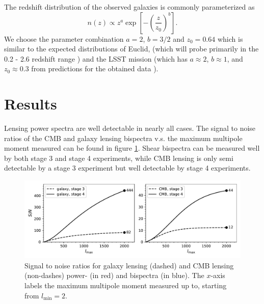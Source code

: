 \documentclass[11pt]{article} %
\newcommand{\br}[1]{\ensuremath{\left( #1 \right)}}
\newcommand{\sbr}[1]{\ensuremath{\left[ #1 \right]}}
\begin{document}
The redshift distribution of the observed galaxies is commonly parameterized as \cite{bartelmann2001weak}
\begin{equation*}
    n(z) \propto z^a \exp\sbr{-\br{\frac{z}{z_0}}^b}.
\end{equation*}
We choose the parameter combination $a = 2$, $b = 3/2$ and $z_0 = 0.64$ which is similar to the expected distributions of Euclid, (which will probe primarily in the 0.2 - 2.6 redshift range \cite{euclidprep10})
and the LSST mission (which has $a \approx 2$, $b \approx 1$, and $z_0 \approx 0.3$ from predictions for the obtained data \cite{lsstsciencebookchapter3}).

\section{Results}\label{sec:results}
Lensing power spectra are well detectable in nearly all cases. 
The signal to noise ratios of the CMB and galaxy lensing bispectra v.s. the maximum multipole moment measured can be found in figure \ref{fig:snrplots}. Shear bispectra can be measured well by both stage 3 and stage 4 experiments, while CMB lensing is only semi detectable by a stage 3 experiment but well detectable by stage 4 experiments.
\begin{figure}[h!]
    \includegraphics[width=\textwidth]{figures/snrplots.pdf}
    \caption{Signal to noise ratios for galaxy lensing (dashed) and CMB lensing (non-dashes) power- (in red) and bispectra (in blue). The $x$-axis labels the maximum multipole moment measured up to, starting from $l_{\min}=2$.}
    \label{fig:snrplots}
\end{figure}
\end{document}
